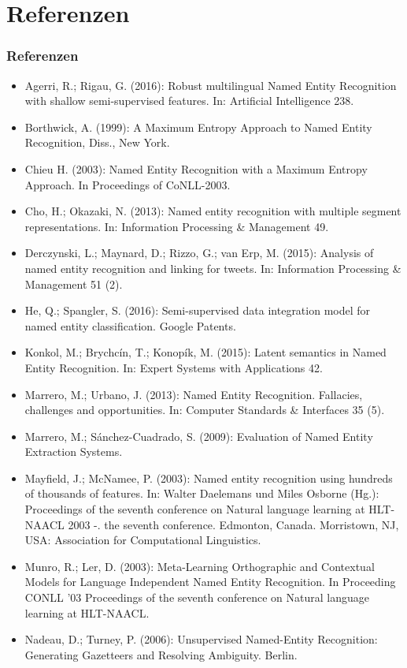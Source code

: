 \documentclass{beamer}
\begin{document}
\section{Referenzen}
	\begin{frame}
		\frametitle{Referenzen}
		\begin{itemize}
			\tiny
			\item Agerri, R.; Rigau, G. (2016): Robust multilingual Named Entity Recognition with shallow semi-supervised features. In: Artificial Intelligence 238.\\
			\item Borthwick, A. (1999): A
				Maximum Entropy Approach to Named Entity Recognition, Diss., New York.\\
			\item Chieu H. (2003): Named Entity Recognition with a Maximum Entropy Approach. In Proceedings of CoNLL-2003.
			\item Cho, H.; Okazaki, N. (2013): Named entity recognition with multiple segment representations. In: Information Processing \& Management 49.\\
			\item Derczynski, L.; Maynard, D.; Rizzo, G.; van Erp, M. (2015): Analysis of named entity recognition and linking for tweets. In: Information Processing \& Management 51 (2).\\
			\item He, Q.; Spangler, S. (2016): Semi-supervised data integration model for named entity classification. Google Patents.
			\item Konkol, M.; Brychcín, T.; Konopík, M. (2015): Latent semantics in Named Entity Recognition. In: Expert Systems with Applications 42.\\
						
			\item Marrero, M.; Urbano, J. (2013): Named Entity Recognition. Fallacies, challenges and opportunities. In: Computer Standards \& Interfaces 35 (5).\\
			\item Marrero, M.; Sánchez-Cuadrado, S. (2009): Evaluation of Named Entity Extraction Systems.\\
						\item Mayfield, J.; McNamee, P. (2003): Named entity recognition using hundreds of thousands of features. In: Walter Daelemans und Miles Osborne (Hg.): Proceedings of the seventh conference on Natural language learning at HLT-NAACL 2003 -. the seventh conference. Edmonton, Canada. Morristown, NJ, USA: Association for Computational Linguistics.\\
						\item Munro, R.; Ler, D. (2003): Meta-Learning Orthographic and Contextual Models for Language Independent Named Entity Recognition. In Proceeding
						CONLL '03 Proceedings of the seventh conference on Natural language learning at HLT-NAACL.\\
						\item Nadeau, D.; Turney, P. (2006): Unsupervised Named-Entity Recognition: Generating Gazetteers and Resolving Ambiguity. Berlin.
						

\end{itemize}
\end{frame}
\end{document}
